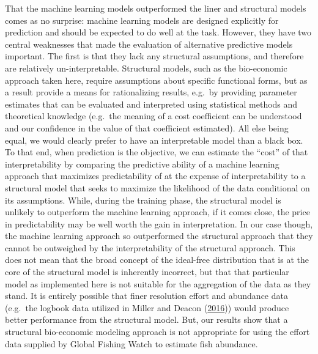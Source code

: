 \documentclass[twoside,12pt,final]{ucthesis-CA2012}
\begin{document}
\begin{ucmainmatter}
That the machine learning models outperformed the liner and structural
models comes as no surprise: machine learning models are designed
explicitly for prediction and should be expected to do well at the task.
However, they have two central weaknesses that made the evaluation of
alternative predictive models important. The first is that they lack any
structural assumptions, and therefore are relatively un-interpretable.
Structural models, such as the bio-economic approach taken here, require
assumptions about specific functional forms, but as a result provide a
means for rationalizing results, e.g.~by providing parameter estimates
that can be evaluated and interpreted using statistical methods and
theoretical knowledge (e.g.~the meaning of a cost coefficient can be
understood and our confidence in the value of that coefficient
estimated). All else being equal, we would clearly prefer to have an
interpretable model than a black box. To that end, when prediction is
the objective, we can estimate the ``cost'' of that interpretability by
comparing the predictive ability of a machine learning approach that
maximizes predictability of at the expense of interpretability to a
structural model that seeks to maximize the likelihood of the data
conditional on its assumptions. While, during the training phase, the
structural model is unlikely to outperform the machine learning
approach, if it comes close, the price in predictability may be well
worth the gain in interpretation. In our case though, the machine
learning approach so outperformed the structural approach that they
cannot be outweighed by the interpretability of the structural approach.
This does not mean that the broad concept of the ideal-free distribution
that is at the core of the structural model is inherently incorrect, but
that that particular model as implemented here is not suitable for the
aggregation of the data as they stand. It is entirely possible that
finer resolution effort and abundance data (e.g.~the logbook data
utilized in Miller and Deacon
(\protect\hyperlink{ref-Miller2016}{2016})) would produce better
performance from the structural model. But, our results show that a
structural bio-economic modeling approach is not appropriate for using
the effort data supplied by Global Fishing Watch to estimate fish
abundance.


\end{ucmainmatter}
\end{document}
